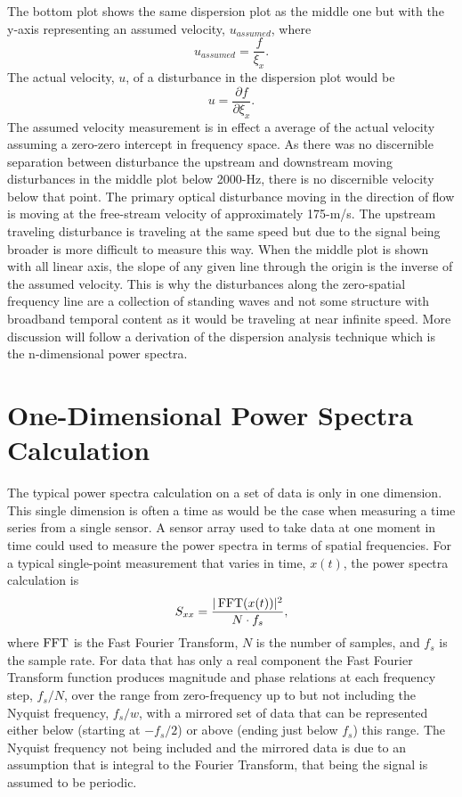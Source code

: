 The bottom plot shows the same dispersion plot as the middle one but with the y-axis representing an assumed velocity, $u_{assumed}$, where
\begin{equation}
  u_{assumed} = \frac{f}{\xi_x} \textrm{.}
  \label{eqn:04_velocity_assumed}
\end{equation}
The actual velocity, $u$, of a disturbance in the dispersion plot would be
\begin{equation}
  u = \frac{\partial f}{\partial \xi_x} \textrm{.}
  \label{eqn:04_velocity_actual}
\end{equation}
The assumed velocity measurement is in effect a average of the actual velocity assuming a zero-zero intercept in frequency space.
As there was no discernible separation between disturbance the upstream and downstream moving disturbances in the middle plot below 2000-Hz, there is no discernible velocity below that point.
The primary optical disturbance moving in the direction of flow is moving at the free-stream velocity of approximately 175-m/s.
The upstream traveling disturbance is traveling at the same speed but due to the signal being broader is more difficult to measure this way.
When the middle plot is shown with all linear axis, the slope of any given line through the origin is the inverse of the assumed velocity.
This is why the disturbances along the zero-spatial frequency line are a collection of standing waves and not some structure with broadband temporal content as it would be traveling at near infinite speed.
More discussion will follow a derivation of the dispersion analysis technique which is the n-dimensional power spectra.

\section{One-Dimensional Power Spectra Calculation}
The typical power spectra calculation on a set of data is only in one dimension.
This single dimension is often a time as would be the case when measuring a time series from a single sensor.
A sensor array used to take data at one moment in time could used to measure the power spectra in terms of spatial frequencies.
For a typical single-point measurement that varies in time, $x(t)$, the power spectra calculation is
\begin{equation}
 S_{xx} = \frac{|\operatorname{FFT}(x(t))|^2}{N\cdot f_{s}} \textrm{,}
 \label{eqn:04_basic_sxx}
\end{equation}
where $\operatorname{FFT}$ is the Fast Fourier Transform, $N$ is the number of samples, and $f_{s}$ is the sample rate.
For data that has only a real component the Fast Fourier Transform function produces magnitude and phase relations at each frequency step, $f_{s}/N$, over the range from zero-frequency up to but not including the Nyquist frequency, $f_s/w$, with a mirrored set of data that can be represented either below (starting at $-f_s/2$) or above (ending just below $f_s$) this range.
The Nyquist frequency not being included and the mirrored data is due to an assumption that is integral to the Fourier Transform, that being the signal is assumed to be periodic.

